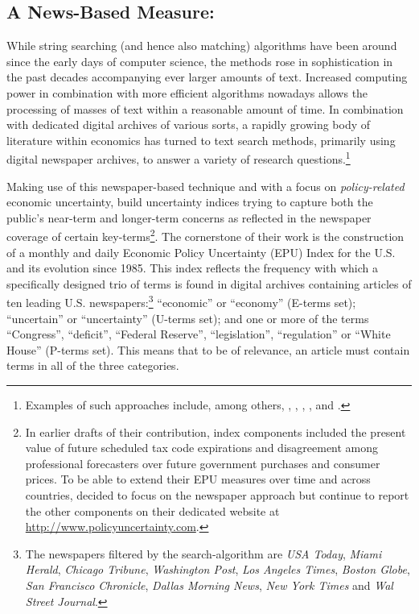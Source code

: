 \documentclass[a4paper,11pt,listof=nochaptergap,oneside,pointednumbers,bibtotoc,bigheadings,liststotoc]{scrbook}
\begin{document}
\subsection{A News-Based Measure: \citet{bakeretal:15}}
\label{sec:epuindex}
While string searching (and hence also matching) algorithms have been around since the early days of computer science, the methods rose in sophistication in the past decades accompanying ever larger amounts of text. Increased computing power in combination with more efficient algorithms nowadays allows the processing of masses of text within a reasonable amount of time. In combination with dedicated digital archives of various sorts, a rapidly growing body of literature within economics has turned to text search methods, primarily using digital newspaper archives, to answer a variety of research questions.\footnote{Examples of such approaches include, among others, \citet{alexopoulosandcohen:09}, \citet{genthkowandshapiro:10}, \citet{hobergandphillips:10}, \citet{boudoukhetal:13}, and \citet{alexopoulosandcohen:15}.}

Making use of this newspaper-based technique and with a focus on \textit{policy-related} economic uncertainty, \citet{bakeretal:15} build uncertainty indices trying to capture both the public's near-term and longer-term concerns as reflected in the newspaper coverage of certain key-terms\footnote{In earlier drafts of their contribution, index components included the present value of future scheduled tax code expirations and disagreement among professional forecasters over future government purchases and consumer prices. To be able to extend their EPU measures over time and across countries, \citet{bakeretal:15} decided to focus on the newspaper approach but continue to report the other components on their dedicated website at \url{http://www.policyuncertainty.com}.}. The cornerstone of their work is the construction of a monthly and daily Economic Policy Uncertainty (EPU) Index for the U.S. and its evolution since 1985. This index reflects the frequency with which a specifically designed trio of terms is found in digital archives containing articles of ten leading U.S. newspapers:\footnote{The newspapers filtered by the search-algorithm are \textit{USA Today}, \textit{Miami Herald}, \textit{Chicago Tribune}, \textit{Washington Post}, \textit{Los Angeles Times}, \textit{Boston Globe}, \textit{San Francisco Chronicle}, \textit{Dallas Morning News}, \textit{New York Times} and \textit{Wal Street Journal}.} ``economic'' or ``economy'' (E-terms set); ``uncertain'' or ``uncertainty'' (U-terms set); and one or more of the terms ``Congress'', ``deficit'', ``Federal Reserve'', ``legislation'', ``regulation'' or ``White House'' (P-terms set). This means that to be of relevance, an article must contain terms in all of the three categories.
\end{document}
